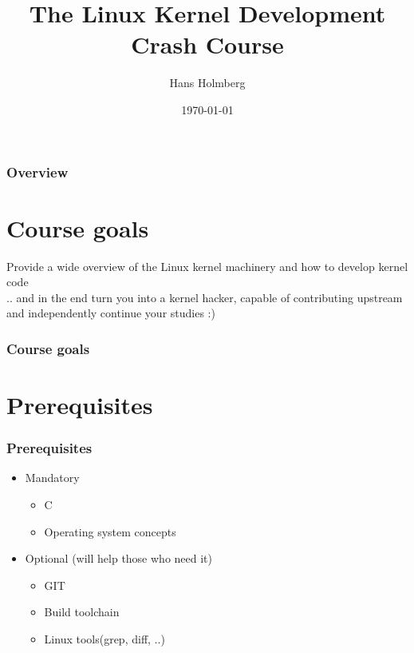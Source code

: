 \documentclass{beamer}
\title[TLKDCC Intro]{The Linux Kernel Development Crash Course}
\author{Hans Holmberg}
\institute[LKTP]
{
Linux Kernel Teaching Project \\ 
\medskip
\textit{hans.holmberg@gmail.com}
}
\date{\today}
\begin{document}
\begin{frame}
\titlepage
 
\end{frame}

\begin{frame}
\frametitle{Overview}
\tableofcontents 
\end{frame}

\section{Course goals} 

\begin{frame}
Provide a wide overview of the Linux kernel machinery and how to develop kernel code \\
.. and in the end turn you into a kernel hacker, capable of contributing upstream and independently continue your studies :)
\frametitle{Course goals}
\end{frame}

\section{Prerequisites}

\begin{frame}
\frametitle{Prerequisites}
\begin{itemize}
	\item Mandatory
	\begin{itemize}
		\item C
		\item Operating system concepts
	\end{itemize}

	\item Optional (will help those who need it)
	\begin{itemize}
		\item GIT
		\item Build toolchain
		\item Linux tools(grep, diff, ..)
	\end{itemize}
\end{itemize}
\end{frame}

\end{document}
